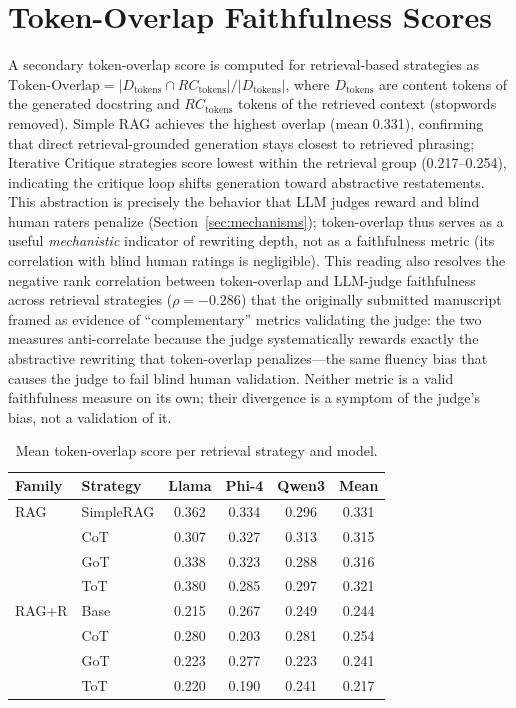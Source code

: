 \documentclass[pdflatex,sn-mathphys-ay]{sn-jnl}%
\theoremstyle{thmstyleone}%
\theoremstyle{thmstyletwo}%
\theoremstyle{thmstylethree}%
\begin{document}
\section{Token-Overlap Faithfulness Scores}
\label{sec:appendix-token-overlap}
A secondary token-overlap score is computed for retrieval-based strategies as
$\text{Token-Overlap} = |D_{\text{tokens}} \cap RC_{\text{tokens}}| / |D_{\text{tokens}}|$,
where $D_{\text{tokens}}$ are content tokens of the generated docstring and $RC_{\text{tokens}}$ tokens of the retrieved context (stopwords removed). Simple RAG achieves the highest overlap (mean 0.331), confirming that direct retrieval-grounded generation stays closest to retrieved phrasing; Iterative Critique strategies score lowest within the retrieval group (0.217--0.254), indicating the critique loop shifts generation toward abstractive restatements. {\color{blue}
This abstraction is precisely the behavior that LLM judges reward and blind human raters penalize (Section~\ref{sec:mechanisms}); token-overlap thus serves as a useful \emph{mechanistic} indicator of rewriting depth, not as a faithfulness metric (its correlation with blind human ratings is negligible). This reading also resolves the negative rank correlation between token-overlap and LLM-judge faithfulness across retrieval strategies ($\rho=-0.286$) that the originally submitted manuscript framed as evidence of ``complementary'' metrics validating the judge: the two measures anti-correlate because the judge systematically rewards exactly the abstractive rewriting that token-overlap penalizes---the same fluency bias that causes the judge to fail blind human validation. Neither metric is a valid faithfulness measure on its own; their divergence is a symptom of the judge's bias, not a validation of it.
}


\begin{table}[h]
\centering
\small
\caption{Mean token-overlap score per retrieval strategy and model.}
\label{tab:token-overlap}
\begin{tabular}{llcccc}
\toprule
\textbf{Family} & \textbf{Strategy} & \textbf{Llama} & \textbf{Phi-4} & \textbf{Qwen3} & \textbf{Mean} \\
\midrule
RAG    & SimpleRAG & 0.362 & 0.334 & 0.296 & 0.331 \\
       & CoT       & 0.307 & 0.327 & 0.313 & 0.315 \\
       & GoT       & 0.338 & 0.323 & 0.288 & 0.316 \\
       & ToT       & 0.380 & 0.285 & 0.297 & 0.321 \\
\midrule
RAG+R  & Base      & 0.215 & 0.267 & 0.249 & 0.244 \\
       & CoT       & 0.280 & 0.203 & 0.281 & 0.254 \\
       & GoT       & 0.223 & 0.277 & 0.223 & 0.241 \\
       & ToT       & 0.220 & 0.190 & 0.241 & 0.217 \\
\bottomrule
\end{tabular}
\end{table}
\end{document}
